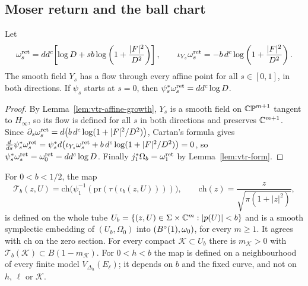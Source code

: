 \subsection{Moser return and the ball chart}\label{sec:vtr-return}

\begin{proposition}\label{prop:vtr-return}
Let
\[
 \omega_s^{\rm ret}=dd^c\!\left[\log D+sb\log\left(1+\frac{|F|^2}{D^2}\right)\right],\qquad
 \iota_{Y_s}\omega_s^{\rm ret}=-b\,d^c\log\left(1+\frac{|F|^2}{D^2}\right).
\]
The smooth field $Y_s$ has a flow through every affine point for all $s\in[0,1]$, in both directions. If $\psi_s$ starts at $s=0$,
then $\psi_s^*\omega_s^{\rm ret}=dd^c\log D$.
\end{proposition}

\begin{proof}
By Lemma~\ref{lem:vtr-affine-growth}, $Y_s$ is a smooth field on $\mathbb{CP}^{m+1}$ tangent to $H_\infty$, so its flow is defined for all
$s$ in both directions and preserves $\mathbb{C}^{m+1}$. Since $\partial_s\omega^{\rm ret}_s=d\bigl(b\,d^c\log(1+|F|^2/D^2)\bigr)$, Cartan's
formula gives $\frac d{ds}\psi_s^*\omega^{\rm ret}_s=\psi_s^*d\bigl(\iota_{Y_s}\omega^{\rm ret}_s+b\,d^c\log(1+|F|^2/D^2)\bigr)=0$,
so $\psi_s^*\omega_s^{\rm ret}=\omega^{\rm ret}_0=dd^c\log D$. Finally $j_1^*\Omega_b=\omega^{\rm ret}_1$ by
Lemma~\ref{lem:vtr-form}.
\end{proof}

\begin{theorem}\label{thm:vtr-transfer}\label{thm:qdr-transfer}
For $0<b<1/2$, the map
\[
 \mathcal T_b(z,U)=\mathrm{ch}\bigl(\psi_1^{-1}(\mathrm{pr}(\tau(\iota_b(z,U))))\bigr),\qquad
 \mathrm{ch}(z)=\frac{z}{\sqrt{\pi(1+|z|^2)}},
\]
is defined on the whole tube $U_b=\{(z,U)\in\Sigma\times\mathbb{C}^m:|p(U)|<b\}$ and is a smooth symplectic embedding of $(U_b,\Omega_0)$
into $(B^{\circ}(1),\omega_0)$, for every $m\ge1$. It agrees with $\mathrm{ch}$ on the zero section. For every compact $\mathcal K\subset
U_b$ there is $m_{\mathcal K}>0$ with $\mathcal T_b(\mathcal K)\subset B(1-m_{\mathcal K})$. For $0<h<b$ the map is defined on a
neighbourhood of every finite model $V_{\Delta_h}(E_\ell)$; it depends on $b$ and the fixed curve, and not on $h$, $\ell$ or
$\mathcal K$.
\end{theorem}

